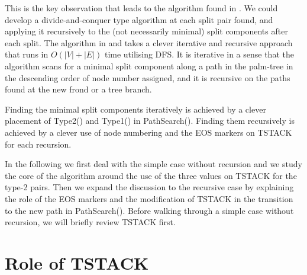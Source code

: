 \documentclass[twoside,twocolumn]{article}
\begin{document}
This is the key observation that leads to the algorithm found in \cite{HT73}.
We could develop a divide-and-conquer type algorithm at each split pair found,
 and applying it recursively to the (not necessarily minimal) split components
 after each split.
The algorithm in \cite{HT73} and \cite{GM01} takes a clever iterative and recursive
approach that runs in $O(|V|+|E|)$ time utilising DFS.
It is iterative in a sense that the algorithm scans for a minimal split
component
 along a path in the palm-tree in the descending order of node number
assigned, and it is recursive on the paths found at the new frond or a tree
branch.

Finding the minimal split components iteratively is achieved by a clever
placement of {\ttfamily Type2()} and {\ttfamily Type1()} in {\ttfamily PathSearch()}.
Finding them recursively is achieved by a clever use of node numbering and
the {\ttfamily EOS} markers on {\ttfamily TSTACK} for each recursion.

In the following we first deal with the simple case without recursion and
we study the core of the algorithm around the use of the three values on
{\ttfamily TSTACK} for the type-2 pairs.
Then we expand the discussion to the recursive case by explaining
the role of the {\ttfamily EOS} markers and the modification of {\ttfamily TSTACK}
in the transition to the new path in {\ttfamily PathSearch()}.
Before walking through a simple case without recursion, we will briefly review
{\ttfamily TSTACK} first.




\section{Role of TSTACK}
\end{document}
